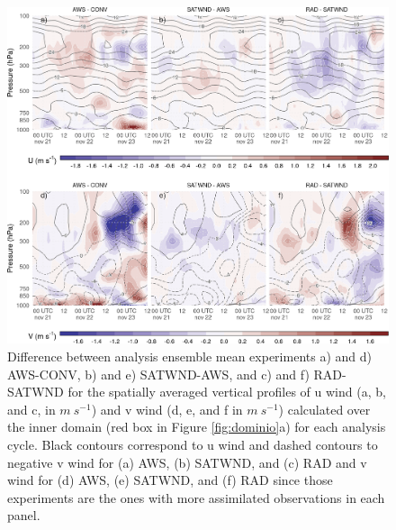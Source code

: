 \documentclass[preprint, 3p, authoryear,review, 12pt]{elsarticle} %
\begin{document}
\begin{figure}[ht]

{\centering \includegraphics{../figures/UV-diff-1} 

}

\caption{Difference between analysis ensemble mean experiments a) and d) AWS-CONV, b) and e) SATWND-AWS, and c) and f) RAD-SATWND for the spatially averaged vertical profiles of u wind (a, b, and c, in \(m\ s^{-1}\)) and v wind (d, e, and f in \(m\ s^{-1}\)) calculated over the inner domain (red box in Figure \ref{fig:dominio}a) for each analysis cycle. Black contours correspond to u wind and dashed contours to negative v wind for (a) AWS, (b) SATWND, and (c) RAD and v wind for (d) AWS, (e) SATWND, and (f) RAD since those experiments are the ones with more assimilated observations in each panel.}\label{fig:UV-diff}
\end{figure}
\end{document}
